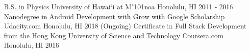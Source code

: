 \begin{cventries}
	\cventry
	{B.S. in Physics}
	{University of Hawai`i at M{\char"101}noa}
	{Honolulu, HI}
	{2011 - 2016}
	{
	}
	\cventry
	{Nanodegree in Android Development with Grow with Google Scholarship}
	{Udacity.com}
	{Honolulu, HI}
	{2018 (Ongoing)}
	{}  
	\cventry
	{Certificate in Full Stack Development from the Hong Kong University of Science and Technology}
	{Coursera.com}
	{Honolulu, HI}
	{2016}
	{}    
\end{cventries}

